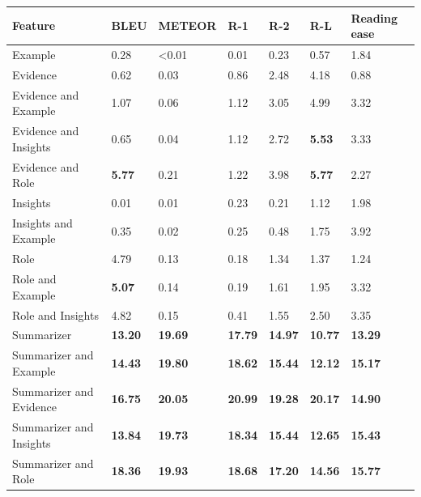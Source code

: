 \begin{tabular}{|l|l|l|l|l|l|l|}
\hline
\textbf{Feature} & BLEU & METEOR & R-1 & R-2 & R-L & Reading ease \\
 \hline
 Example & 0.28 & \textless{}0.01 & 0.01 & 0.23 & 0.57 & 1.84 \\
 \hline
 Evidence & 0.62 & 0.03 & 0.86 & 2.48 & 4.18 & 0.88 \\
 \hline
 Evidence and Example & 1.07 & 0.06 & 1.12 & 3.05 & 4.99 & 3.32 \\
 \hline
 Evidence and Insights & 0.65 & 0.04 & 1.12 & 2.72 & \textbf{5.53} & 3.33 \\
 \hline
 Evidence and Role & \textbf{5.77} & 0.21 & 1.22 & 3.98 & \textbf{5.77} & 2.27 \\
 \hline
 Insights & 0.01 & 0.01 & 0.23 & 0.21 & 1.12 & 1.98 \\
 \hline
 Insights and Example & 0.35 & 0.02 & 0.25 & 0.48 & 1.75 & 3.92 \\
 \hline
 Role & 4.79 & 0.13 & 0.18 & 1.34 & 1.37 & 1.24 \\
 \hline
 Role and Example & \textbf{5.07} & 0.14 & 0.19 & 1.61 & 1.95 & 3.32 \\
 \hline
 Role and Insights & 4.82 & 0.15 & 0.41 & 1.55 & 2.50 & 3.35 \\
 \hline
 Summarizer & \textbf{13.20} & \textbf{19.69} & \textbf{17.79} & \textbf{14.97} & \textbf{10.77} & \textbf{13.29} \\
 \hline
 Summarizer and Example & \textbf{14.43} & \textbf{19.80} & \textbf{18.62} & \textbf{15.44} & \textbf{12.12} & \textbf{15.17} \\
 \hline
 Summarizer and Evidence & \textbf{16.75} & \textbf{20.05} & \textbf{20.99} & \textbf{19.28} & \textbf{20.17} & \textbf{14.90} \\
 \hline
 Summarizer and Insights & \textbf{13.84} & \textbf{19.73} & \textbf{18.34} & \textbf{15.44} & \textbf{12.65} & \textbf{15.43} \\
 \hline
 Summarizer and Role & \textbf{18.36} & \textbf{19.93} & \textbf{18.68} & \textbf{17.20} & \textbf{14.56} & \textbf{15.77} \\
\hline
\end{tabular}
